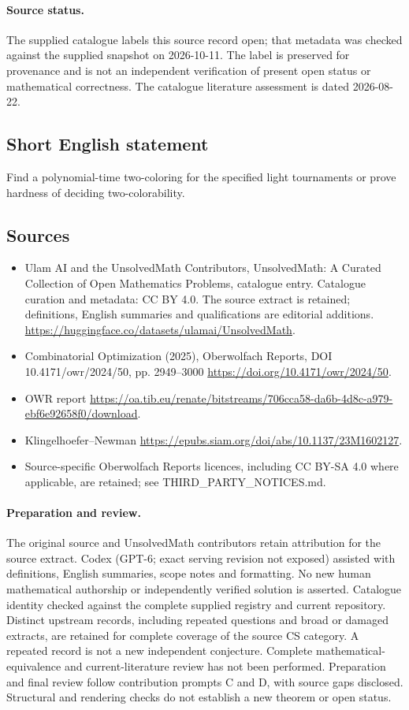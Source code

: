 \documentclass[11pt]{article}
\begin{document}
\paragraph{Source status.}
The supplied catalogue labels this source record open; that metadata was checked against the supplied snapshot on 2026-10-11. The label is preserved for provenance and is not an independent verification of present open status or mathematical correctness. The catalogue literature assessment is dated 2026-08-22.
\subsection{Short English statement}
Find a polynomial-time two-coloring for the specified light tournaments or prove hardness of deciding two-colorability.
\subsection{Sources}
\begin{itemize}
\item[S1] Ulam AI and the UnsolvedMath Contributors, UnsolvedMath: A Curated Collection of Open Mathematics Problems, catalogue entry. Catalogue curation and metadata: CC BY 4.0. The source extract is retained; definitions, English summaries and qualifications are editorial additions.
\url{https://huggingface.co/datasets/ulamai/UnsolvedMath}.
\item[S2] Combinatorial Optimization (2025), Oberwolfach Reports, DOI 10.4171/owr/2024/50, pp. 2949--3000
\url{https://doi.org/10.4171/owr/2024/50}.
\item[S3] OWR report
\url{https://oa.tib.eu/renate/bitstreams/706cca58-da6b-4d8c-a979-ebf6e92658f0/download}.
\item[S4] Klingelhoefer--Newman
\url{https://epubs.siam.org/doi/abs/10.1137/23M1602127}.
\item Source-specific Oberwolfach Reports licences, including CC BY-SA 4.0 where applicable, are retained; see THIRD\_PARTY\_NOTICES.md.
\end{itemize}
\paragraph{Preparation and review.}
The original source and UnsolvedMath contributors retain attribution for the source extract. Codex (GPT-6; exact serving revision not exposed) assisted with definitions, English summaries, scope notes and formatting. No new human mathematical authorship or independently verified solution is asserted. Catalogue identity checked against the complete supplied registry and current repository. Distinct upstream records, including repeated questions and broad or damaged extracts, are retained for complete coverage of the source CS category. A repeated record is not a new independent conjecture. Complete mathematical-equivalence and current-literature review has not been performed. Preparation and final review follow contribution prompts C and D, with source gaps disclosed. Structural and rendering checks do not establish a new theorem or open status.
\label{end:statement}
\end{document}
